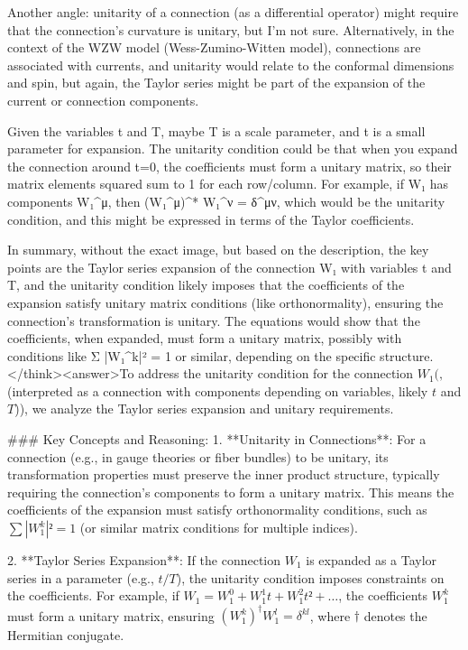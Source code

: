 Another angle: unitarity of a connection (as a differential operator) might require that the connection's curvature is unitary, but I'm not sure. Alternatively, in the context of the WZW model (Wess-Zumino-Witten model), connections are associated with currents, and unitarity would relate to the conformal dimensions and spin, but again, the Taylor series might be part of the expansion of the current or connection components.

Given the variables t and T, maybe T is a scale parameter, and t is a small parameter for expansion. The unitarity condition could be that when you expand the connection around t=0, the coefficients must form a unitary matrix, so their matrix elements squared sum to 1 for each row/column. For example, if W₁ has components W₁^μ, then (W₁^μ)^* W₁^ν = δ^μν, which would be the unitarity condition, and this might be expressed in terms of the Taylor coefficients.

In summary, without the exact image, but based on the description, the key points are the Taylor series expansion of the connection W₁ with variables t and T, and the unitarity condition likely imposes that the coefficients of the expansion satisfy unitary matrix conditions (like orthonormality), ensuring the connection's transformation is unitary. The equations would show that the coefficients, when expanded, must form a unitary matrix, possibly with conditions like Σ |W₁^k|² = 1 or similar, depending on the specific structure.</think><answer>To address the unitarity condition for the connection \( W_1(, \) (interpreted as a connection with components depending on variables, likely \( t \) and \( T \))), we analyze the Taylor series expansion and unitary requirements.  

### Key Concepts and Reasoning:  
1. **Unitarity in Connections**: For a connection (e.g., in gauge theories or fiber bundles) to be unitary, its transformation properties must preserve the inner product structure, typically requiring the connection’s components to form a unitary matrix. This means the coefficients of the expansion must satisfy orthonormality conditions, such as \( \sum |W_1^k|² = 1 \) (or similar matrix conditions for multiple indices).  

2. **Taylor Series Expansion**: If the connection \( W_1 \) is expanded as a Taylor series in a parameter (e.g., \( t/T \)), the unitarity condition imposes constraints on the coefficients. For example, if \( W_1 = W_1^0 + W_1^1 t + W_1^2 t² + \dots \), the coefficients \( W_1^k \) must form a unitary matrix, ensuring \( (W_1^k)^\dagger W_1^l = \delta^{kl} \), where \( \dagger \) denotes the Hermitian conjugate.  

